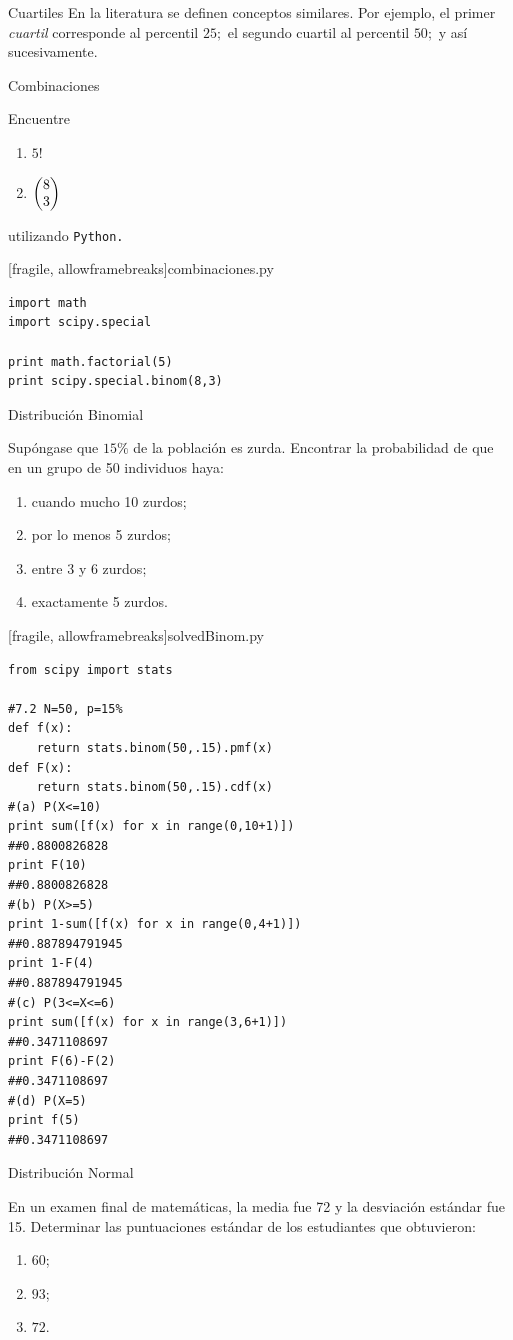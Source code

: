 {Cuartiles}
 En la literatura se definen conceptos similares. Por ejemplo, el primer \emph{cuartil} corresponde al percentil $25;$ el segundo cuartil al percentil $50;$ y así sucesivamente.

{Combinaciones}
 \begin{ejemplo}
  \label{sol:7.1}
  Encuentre
  \begin{enumerate}
   \item $5!$
   \item $\begin{pmatrix} 8 \\ 3\end{pmatrix}$
  \end{enumerate}
  utilizando \texttt{Python.}
 \end{ejemplo}


[fragile, allowframebreaks]{combinaciones.py}
 \begin{verbatim}
import math
import scipy.special

print math.factorial(5)
print scipy.special.binom(8,3)
 \end{verbatim}




{Distribución Binomial}
 \begin{ejemplo}
  \label{sol:7.2}
  Supóngase que $15\%$ de la población es zurda. Encontrar la probabilidad de que en un grupo de 50 individuos haya:
  \begin{enumerate}
   \item cuando mucho 10 zurdos; 
   \item por lo menos 5 zurdos; 
   \item entre 3 y 6 zurdos; 
   \item exactamente 5 zurdos.
  \end{enumerate}

 \end{ejemplo}


[fragile, allowframebreaks]{solvedBinom.py}
 \begin{verbatim}
from scipy import stats

#7.2 N=50, p=15%
def f(x):
    return stats.binom(50,.15).pmf(x)
def F(x):
    return stats.binom(50,.15).cdf(x)
#(a) P(X<=10)
print sum([f(x) for x in range(0,10+1)])
##0.8800826828
print F(10)
##0.8800826828
#(b) P(X>=5)
print 1-sum([f(x) for x in range(0,4+1)])
##0.887894791945
print 1-F(4)
##0.887894791945
#(c) P(3<=X<=6)
print sum([f(x) for x in range(3,6+1)])
##0.3471108697
print F(6)-F(2)
##0.3471108697
#(d) P(X=5)
print f(5)
##0.3471108697
 \end{verbatim}



{Distribución Normal}
 \begin{ejemplo}
  \label{sol:7.14}
  En un examen final de matemáticas, la media fue 72 y la desviación estándar fue 15. Determinar las puntuaciones estándar de los estudiantes que obtuvieron:
  \begin{enumerate}
   \item $60$;
   \item $93$;
   \item $72$.
  \end{enumerate}

 \end{ejemplo}



